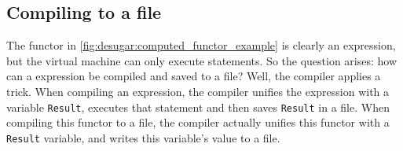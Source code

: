 \documentclass[a4paper]{memoir}
\begin{document}
\begin{appendices}
\chapter{Compiling to a file}

The functor in \ref{fig:desugar:computed_functor_example} is clearly an
expression, but the virtual machine can only execute statements. So the question
arises: how can a expression be compiled and saved to a file? Well, the compiler 
applies a trick. When compiling an expression, the compiler unifies the
expression with a variable \lstinline!Result!, executes that statement and then
saves \lstinline!Result! in a file.
When compiling this functor to a file, the compiler actually unifies this functor with a
\lstinline!Result! variable, and writes this variable's value to a file.


\end{appendices}
\end{document}
